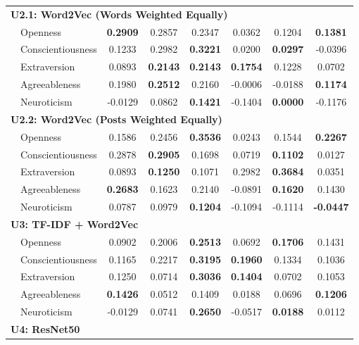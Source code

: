 \begin{longtable}{llcccccc}
\hline
\multicolumn{8}{l}{\textbf{U2.1: Word2Vec (Words Weighted Equally)}} \\

& Openness & \textbf{0.2909} & 0.2857 & 0.2347 & 0.0362 & 0.1204 & \textbf{0.1381} \\
& Conscientiousness & 0.1233 & 0.2982 & \textbf{0.3221} & 0.0200 & \textbf{0.0297} & -0.0396 \\
& Extraversion & 0.0893 & \textbf{0.2143} & \textbf{0.2143} & \textbf{0.1754} & 0.1228 & 0.0702 \\
& Agreeableness & 0.1980 & \textbf{0.2512} & 0.2160 & -0.0006 & -0.0188 & \textbf{0.1174} \\
& Neuroticism & -0.0129 & 0.0862 & \textbf{0.1421} & -0.1404 & \textbf{0.0000} & -0.1176 \\

\hline
\multicolumn{8}{l}{\textbf{U2.2: Word2Vec (Posts Weighted Equally)}} \\

& Openness & 0.1586 & 0.2456 & \textbf{0.3536} & 0.0243 & 0.1544 & \textbf{0.2267} \\
& Conscientiousness & 0.2878 & \textbf{0.2905} & 0.1698 & 0.0719 & \textbf{0.1102} & 0.0127 \\
& Extraversion & 0.0893 & \textbf{0.1250} & 0.1071 & 0.2982 & \textbf{0.3684} & 0.0351 \\
& Agreeableness & \textbf{0.2683} & 0.1623 & 0.2140 & -0.0891 & \textbf{0.1620} & 0.1430 \\
& Neuroticism & 0.0787 & 0.0979 & \textbf{0.1204} & -0.1094 & -0.1114 & \textbf{-0.0447} \\

\hline
\multicolumn{8}{l}{\textbf{U3: TF-IDF + Word2Vec}} \\

& Openness & 0.0902 & 0.2006 & \textbf{0.2513} & 0.0692 & \textbf{0.1706} & 0.1431 \\
& Conscientiousness & 0.1165 & 0.2217 & \textbf{0.3195} & \textbf{0.1960} & 0.1334 & 0.1036 \\
& Extraversion & 0.1250 & 0.0714 & \textbf{0.3036} & \textbf{0.1404} & 0.0702 & 0.1053 \\
& Agreeableness & \textbf{0.1426} & 0.0512 & 0.1409 & 0.0188 & 0.0696 & \textbf{0.1206} \\
& Neuroticism & -0.0129 & 0.0741 & \textbf{0.2650} & -0.0517 & \textbf{0.0188} & 0.0112 \\

\hline
\multicolumn{8}{l}{\textbf{U4: ResNet50}} \\


\end{longtable}
